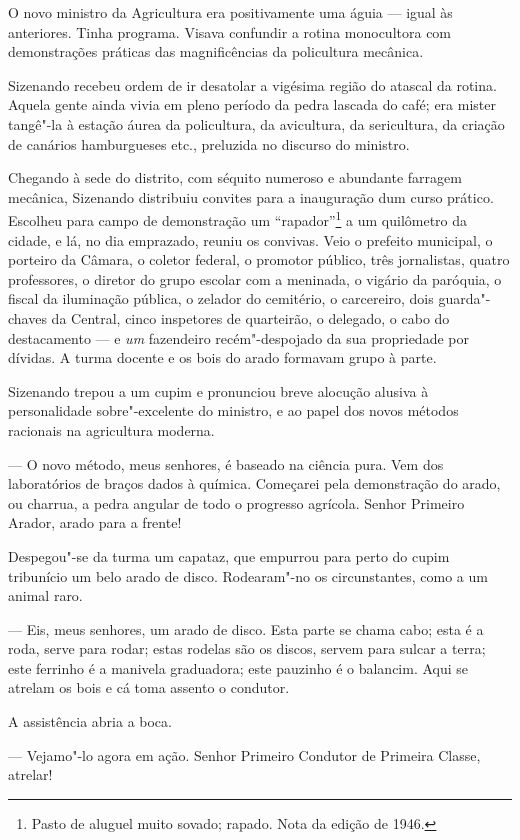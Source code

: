 O novo ministro da Agricultura era positivamente uma águia --- igual às
anteriores. Tinha programa. Visava confundir a rotina monocultora com
demonstrações práticas das magnificências da policultura mecânica.

Sizenando recebeu ordem de ir desatolar a vigésima região do atascal da
rotina. Aquela gente ainda vivia em pleno período da pedra lascada do
café; era mister tangê"-la à estação áurea da policultura, da avicultura,
da sericultura, da criação de canários hamburgueses etc., preluzida no
discurso do ministro.

Chegando à sede do distrito, com séquito numeroso e abundante farragem
mecânica, Sizenando distribuiu convites para a inauguração dum curso
prático. Escolheu para campo de demonstração um ``rapador''\footnote{Pasto
  de aluguel muito sovado; rapado. Nota da edição de 1946.} a um
quilômetro da cidade, e lá, no dia emprazado, reuniu os convivas. Veio o
prefeito municipal, o porteiro da Câmara, o coletor federal, o promotor
público, três jornalistas, quatro professores, o diretor do grupo
escolar com a meninada, o vigário da paróquia, o fiscal da iluminação
pública, o zelador do cemitério, o carcereiro, dois guarda"-chaves da
Central, cinco inspetores de quarteirão, o delegado, o cabo do
destacamento --- e \emph{um} fazendeiro recém"-despojado da sua
propriedade por dívidas. A turma docente e os bois do arado formavam
grupo à parte.

Sizenando trepou a um cupim e pronunciou breve alocução alusiva à
personalidade sobre"-excelente do ministro, e ao papel dos novos métodos
racionais na agricultura moderna.

--- O novo método, meus senhores, é baseado na ciência pura. Vem dos
laboratórios de braços dados à química. Começarei pela demonstração do
arado, ou charrua, a pedra angular de todo o progresso agrícola. Senhor
Primeiro Arador, arado para a frente!

Despegou"-se da turma um capataz, que empurrou para perto do cupim
tribunício um belo arado de disco. Rodearam"-no os circunstantes, como a
um animal raro.

--- Eis, meus senhores, um arado de disco. Esta parte se chama cabo;
esta é a roda, serve para rodar; estas rodelas são os discos, servem
para sulcar a terra; este ferrinho é a manivela graduadora; este
pauzinho é o balancim. Aqui se atrelam os bois e cá toma assento o
condutor.

A assistência abria a boca.

--- Vejamo"-lo agora em ação. Senhor Primeiro Condutor de Primeira
Classe, atrelar!

